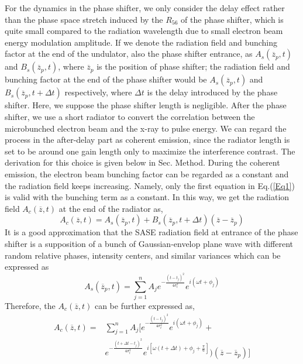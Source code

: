 \documentclass[%
 preprint,
 amsmath,amssymb,
 aps,
 prl,
 superscriptaddress,
 floatfix,
 letter,
]{revtex4-1}
\begin{document}
For the dynamics in the phase shifter, we only consider the delay effect rather than the phase space stretch induced by the $R_{56} $ of the phase shifter, which is quite small compared to the radiation wavelength due to small electron beam energy modulation amplitude. If we denote the radiation field and bunching factor at the end of the undulator, also the phase shifter entrance, as $A_{s}(\overline{z}_{p},t)$ and $B_{s}(\overline{z}_{p},t)$, where $\overline{z}_{p}$ is the position of phase shifter; the radiation field and bunching factor at the end of the phase shifter would be $A_{s}(\overline{z}_{p},t)$ and $B_{s}(\overline{z}_{p},t+\Delta t)$ respectively, where $\Delta t$ is the delay introduced by the phase shifter. Here, we suppose the phase shifter length is negligible. After the phase shifter, we use a short radiator to convert the correlation between the microbunched electron beam and the x-ray to pulse energy. We can regard the process in the after-delay part as coherent emission, since the radiator length is set to be around one gain length only to maximize the interference contrast. The derivation for this choice is given below in Sec. Method. During the coherent emission, the electron beam bunching factor can be regarded as a constant and the radiation field keeps increasing. Namely, only the first equation in Eq.(\ref{Eq1}) is valid with the bunching term as a constant. In this way, we get the radiation field $A_{c}(\overline{z},t)$ at the end of the radiator as,
\begin{equation}\label{Eq3}
        A_{c}(\overline{z},t) =A_{s}(\overline{z}_{p},t)+B_{s}(\overline{z}_{p},t+\Delta t)(\overline{z}-\overline{z}_{p})
\end{equation}
It is a good approximation that the SASE radiation field at entrance of the phase shifter is a supposition of a bunch of Gaussian-envelop plane wave with different random relative phases, intensity centers, and similar variances which can be expressed as
\begin{equation}\label{Eq4}
        A_{s}(\overline{z}_{p},t)
         =\sum_{j=1}^{n} A_{j}e^{-\frac{(t-t_{j})^2}{4\sigma_{t}^2}}e^{i(\omega t+\phi_j)}
\end{equation}
Therefore, the $A_{c}(\overline{z},t)$ can be further expressed as,
\begin{equation}\label{Eq5}
\begin{split}
A_{c}(\overline{z},t)
=&\sum_{j=1}^{n} A_{j}[e^{-\frac{(t-t_{j})^2}{4\sigma_{t}^2}}e^{i(\omega t+\phi_j)}+ \\
&e^{-\frac{(t+\Delta t-t_{j})^2}{4\sigma_{t}^2}}e^{i[\omega (t+\Delta t)+\phi_j+\frac{\pi}{6}]})(\overline{z}-\overline{z}_{p})]
\end{split}
\end{equation}
\end{document}
